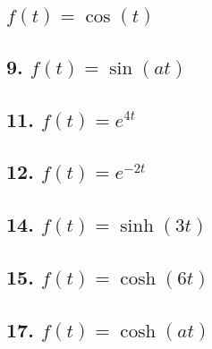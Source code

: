 \documentclass[12pt, a4paper]{article}
\begin{document}
\sffamily


\newpage

\subsection*{\texorpdfstring{\(f(t)=\cos(t)\)}{f(t)=cos(t)}}


\subsection*{9. $f(t)=\sin(at)$}


\subsection*{11. $f(t)=e^{4t}$}


\subsection*{12. $f(t)=e^{-2t}$}


\subsection*{14. $f(t)=\sinh(3t)$}


\subsection*{15. $f(t)=\cosh(6t)$}


\subsection*{17. $f(t)=\cosh(at)$}
\end{document}
